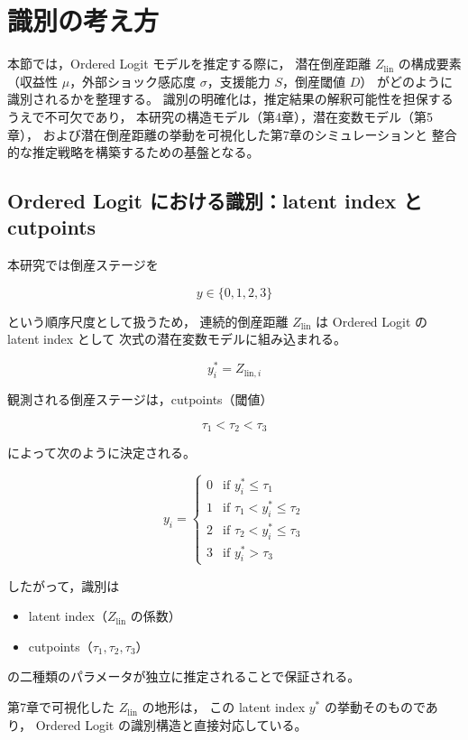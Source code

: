 \section{識別の考え方}

本節では，Ordered Logit モデルを推定する際に，
潜在倒産距離 $Z_{\text{lin}}$ の構成要素
（収益性 $\mu$，外部ショック感応度 $\sigma$，支援能力 $S$，倒産閾値 $D$）
がどのように識別されるかを整理する。
識別の明確化は，推定結果の解釈可能性を担保するうえで不可欠であり，
本研究の構造モデル（第4章），潜在変数モデル（第5章），
および潜在倒産距離の挙動を可視化した第7章のシミュレーションと
整合的な推定戦略を構築するための基盤となる。

\subsection{Ordered Logit における識別：latent index と cutpoints}

本研究では倒産ステージを


\[
y \in \{0,1,2,3\}
\]


という順序尺度として扱うため，
連続的倒産距離 $Z_{\text{lin}}$ は Ordered Logit の latent index として
次式の潜在変数モデルに組み込まれる。



\[
y^*_i = Z_{\text{lin},i}
\]



観測される倒産ステージは，cutpoints（閾値）


\[
\tau_1 < \tau_2 < \tau_3
\]


によって次のように決定される。



\[
y_i =
\begin{cases}
0 & \text{if } y^*_i \le \tau_1 \\
1 & \text{if } \tau_1 < y^*_i \le \tau_2 \\
2 & \text{if } \tau_2 < y^*_i \le \tau_3 \\
3 & \text{if } y^*_i > \tau_3
\end{cases}
\]



したがって，識別は
\begin{itemize}
    \item latent index（$Z_{\text{lin}}$ の係数）
    \item cutpoints（$\tau_1,\tau_2,\tau_3$）
\end{itemize}
の二種類のパラメータが独立に推定されることで保証される。

第7章で可視化した $Z_{\text{lin}}$ の地形は，
この latent index $y^*$ の挙動そのものであり，
Ordered Logit の識別構造と直接対応している。

